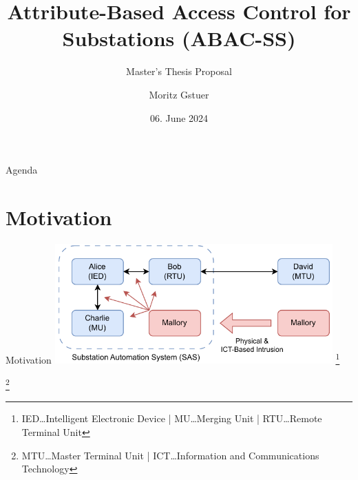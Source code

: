\documentclass[en]{sdqbeamer}
\title[ABAC for Substations]{Attribute-Based Access Control for Substations (ABAC-SS)}
\subtitle{Master's Thesis Proposal}
\author[Moritz Gstuer]{Moritz Gstuer}
\date[06.\,06.\,2024]{06. June 2024}
\newcommand\nonumberfootnote[1]{%
  \begingroup
  \renewcommand\thefootnote{}\footnote{#1}%
  \addtocounter{footnote}{-1}%
  \endgroup
}
\begin{document}
 
\KITtitleframe

\begin{frame}{Agenda}
\tableofcontents
\end{frame}

\section{Motivation}
\begin{frame}{Motivation}
    \centering
	\includegraphics[width=0.8\textwidth]{./figures/sas_intrusion.drawio.pdf}
    \nonumberfootnote{IED\dots Intelligent Electronic Device | MU\dots Merging Unit | RTU\dots Remote Terminal Unit}
    \nonumberfootnote{MTU\dots Master Terminal Unit | ICT\dots Information and Communications Technology}
\end{frame}
\end{document}
